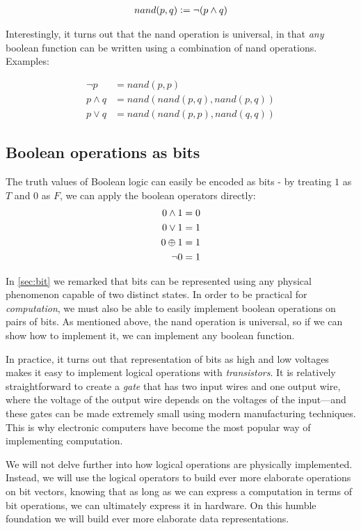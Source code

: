 \begin{align}
  nand(p,q) \vcentcolon= \neg (p \land q)
\end{align}

Interestingly, it turns out that the nand operation is universal, in
that \emph{any} boolean function can be written using a combination of
nand operations.  Examples:

\begin{align}
  \neg p &= nand(p,p) \\
  p \land q &= nand(nand(p,q),nand(p,q)) \\
  p \lor q &= nand(nand(p,p),nand(q,q))
\end{align}

\subsection{Boolean operations as bits}

The truth values of Boolean logic can easily be encoded as bits - by
treating $1$ as $T$ and $0$ as $F$, we can apply the boolean operators
directly:
\begin{align}
  0 \land 1 &= 0 \\
  0 \lor 1 &= 1 \\
  0 \oplus 1 &= 1 \\
  \neg 0 &= 1
\end{align}

In \cref{sec:bit} we remarked that bits can be represented using any
physical phenomenon capable of two distinct states.  In order to be
practical for \emph{computation}, we must also be able to easily
implement boolean operations on pairs of bits.  As mentioned above,
the nand operation is universal, so if we can show how to implement
it, we can implement any boolean function.

In practice, it turns out that representation of bits as high and low
voltages makes it easy to implement logical operations with
\emph{transistors}.  It is relatively straightforward to create a
\emph{gate} that has two input wires and one output wire, where the
voltage of the output wire depends on the voltages of the input---and
these gates can be made extremely small using modern manufacturing
techniques.  This is why electronic computers have become the most
popular way of implementing computation.

We will not delve further into how logical operations are physically
implemented.  Instead, we will use the logical operators to build ever
more elaborate operations on bit vectors, knowing that as long as we
can express a computation in terms of bit operations, we can
ultimately express it in hardware.  On this humble foundation we will
build ever more elaborate data representations.

